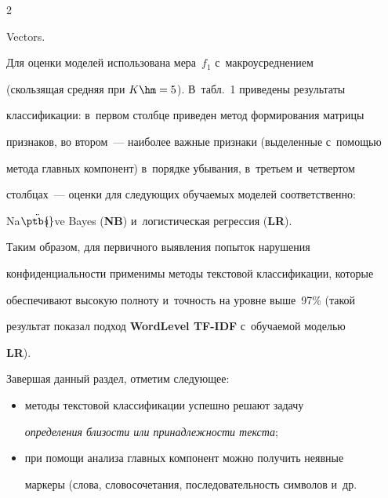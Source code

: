 \begin{multicols}{2}
\begin{itemize}
\begin{itemize}
{Vectors}.


  \end{itemize}


  \end{itemize}


  


  Для оценки моделей использована мера~$f_1$ с~мак\-ро\-усред\-не\-ни\-ем 


(скользящая средняя при $K\hm=5$). В~табл.~1 приведены результаты 


классификации: в~первом столбце приведен метод формирования матрицы 


признаков, во втором~--- наиболее важные признаки (выделенные с~помощью 


метода главных компонент) в~порядке убывания, в~третьем и~четвертом 


столбцах~--- оценки для следующих обучаемых моделей соответственно: 


\mbox{Na$\ddot{\mbox{\ptb{\!\!\i}}}$ve} Bayes (\textbf{NB}) и~логистическая регрессия (\textbf{LR}).


  





  


  Таким образом, для первичного выявления попыток нарушения 


конфиденциальности применимы методы текстовой классификации, которые 


обеспечивают высокую полноту и~точность на \mbox{уровне} выше~97\% (такой 


результат показал подход \textbf{WordLevel TF-IDF} с~обуча\-емой моделью 


\textbf{LR}).


  


  Завершая данный раздел, отметим следующее:


  \begin{itemize}


\item методы текстовой классификации успешно решают задачу 


\textit{определения бли\-зости или принадлежности текста};


\item при помощи анализа главных компонент можно получить неявные 


маркеры (слова, словосочетания, последовательность символов и~др.\ 



\end{itemize}
\end{multicols}
